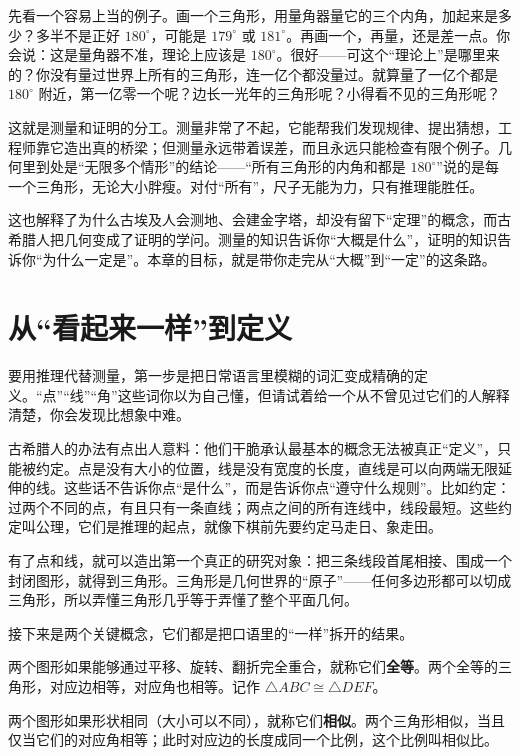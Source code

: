 先看一个容易上当的例子。画一个三角形，用量角器量它的三个内角，加起来是多少？多半不是正好 $180^\circ$，可能是 $179^\circ$ 或 $181^\circ$。再画一个，再量，还是差一点。你会说：这是量角器不准，理论上应该是 $180^\circ$。很好——可这个“理论上”是哪里来的？你没有量过世界上所有的三角形，连一亿个都没量过。就算量了一亿个都是 $180^\circ$ 附近，第一亿零一个呢？边长一光年的三角形呢？小得看不见的三角形呢？

这就是测量和证明的分工。测量非常了不起，它能帮我们发现规律、提出猜想，工程师靠它造出真的桥梁；但测量永远带着误差，而且永远只能检查有限个例子。几何里到处是“无限多个情形”的结论——“所有三角形的内角和都是 $180^\circ$”说的是每一个三角形，无论大小胖瘦。对付“所有”，尺子无能为力，只有推理能胜任。

这也解释了为什么古埃及人会测地、会建金字塔，却没有留下“定理”的概念，而古希腊人把几何变成了证明的学问。测量的知识告诉你“大概是什么”，证明的知识告诉你“为什么一定是”。本章的目标，就是带你走完从“大概”到“一定”的这条路。

\section{从“看起来一样”到定义}

要用推理代替测量，第一步是把日常语言里模糊的词汇变成精确的定义。“点”“线”“角”这些词你以为自己懂，但请试着给一个从不曾见过它们的人解释清楚，你会发现比想象中难。

古希腊人的办法有点出人意料：他们干脆承认最基本的概念无法被真正“定义”，只能被约定。点是没有大小的位置，线是没有宽度的长度，直线是可以向两端无限延伸的线。这些话不告诉你点“是什么”，而是告诉你点“遵守什么规则”。比如约定：过两个不同的点，有且只有一条直线；两点之间的所有连线中，线段最短。这些约定叫公理，它们是推理的起点，就像下棋前先要约定马走日、象走田。

有了点和线，就可以造出第一个真正的研究对象：把三条线段首尾相接、围成一个封闭图形，就得到三角形。三角形是几何世界的“原子”——任何多边形都可以切成三角形，所以弄懂三角形几乎等于弄懂了整个平面几何。

接下来是两个关键概念，它们都是把口语里的“一样”拆开的结果。

\begin{dingyi}[全等]
两个图形如果能够通过平移、旋转、翻折完全重合，就称它们\textbf{全等}。两个全等的三角形，对应边相等，对应角也相等。记作 $\triangle ABC \cong \triangle DEF$。
\end{dingyi}

\begin{dingyi}[相似]
两个图形如果形状相同（大小可以不同），就称它们\textbf{相似}。两个三角形相似，当且仅当它们的对应角相等；此时对应边的长度成同一个比例，这个比例叫相似比。
\end{dingyi}


